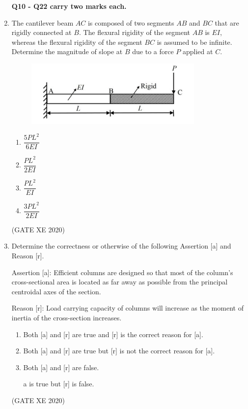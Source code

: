 \documentclass[12pt]{article}
\begin{document}
\begin{enumerate}
(GATE XE 2020)

\item[] \textbf{Q10 - Q22 carry two marks each.}

\item The cantilever beam $AC$ is composed of two segments $AB$ and $BC$ that are rigidly connected at $B$. The flexural rigidity of the segment $AB$ is $EI$, whereas the flexural rigidity of the segment $BC$ is assumed to be infinite. Determine the magnitude of slope at $B$ due to a force $P$ applied at $C$.

\begin{figure}[H]
    \centering
    \includegraphics[width=0.5\columnwidth]{figs/ass4_d_q10.png}
    \caption{}
    \label{fig:placeholder}
\end{figure}

\begin{enumerate}
\item $\dfrac{5PL^2}{6EI}$
\item $\dfrac{PL^2}{2EI}$
\item $\dfrac{PL^2}{EI}$
\item $\dfrac{3PL^2}{2EI}$
\end{enumerate}
(GATE XE 2020)

\item Determine the correctness or otherwise of the following Assertion [a] and Reason [r].

Assertion [a]: Efficient columns are designed so that most of the column’s cross-sectional area is located as far away as possible from the principal centroidal axes of the section.  

Reason [r]: Load carrying capacity of columns will increase as the moment of inertia of the cross-section increases.  

\begin{enumerate}
\item Both [a] and [r] are true and [r] is the correct reason for [a].
\item Both [a] and [r] are true but [r] is not the correct reason for [a].
\item Both [a] and [r] are false.
\item [a] is true but [r] is false.
\end{enumerate}
(GATE XE 2020)


\end{enumerate}
\end{document}
